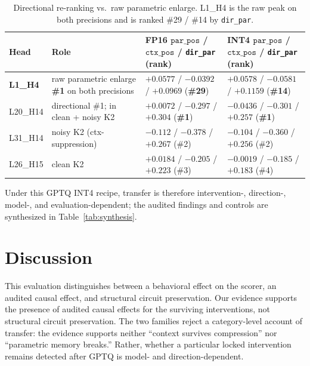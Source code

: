\documentclass{article} %
\begin{document}
\begin{table}[t]
\vspace{-6pt}
\caption{Directional re-ranking vs.\ raw parametric enlarge. L1\_H4 is the raw peak on both precisions and is ranked \#29 / \#14 by \texttt{dir\_par}.}
\label{tab:blindspot}
\centering
\scriptsize
\setlength{\tabcolsep}{2.5pt}
\begin{tabular}{p{0.55in}p{1.15in}p{1.7in}p{1.7in}}
\toprule
Head & Role & FP16 $\texttt{par\_pos}$ / $\texttt{ctx\_pos}$ / \texttt{dir\_par} (rank) & INT4 $\texttt{par\_pos}$ / $\texttt{ctx\_pos}$ / \texttt{dir\_par} (rank) \\
\midrule
\textbf{L1\_H4} & raw parametric enlarge \textbf{\#1} on both precisions & $\mathbf{+0.0577}$ / $-0.0392$ / $+0.0969$ (\textbf{\#29}) & $\mathbf{+0.0578}$ / $-0.0581$ / $+0.1159$ (\textbf{\#14}) \\
L20\_H14 & directional \#1; in clean + noisy K2 & $+0.0072$ / $-0.297$ / $\mathbf{+0.304}$ (\textbf{\#1}) & $\mathbf{-0.0436}$ / $-0.301$ / $+0.257$ (\textbf{\#1}) \\
L31\_H14 & noisy K2 (ctx-suppression) & $-0.112$ / $-0.378$ / $+0.267$ (\#2) & $-0.104$ / $-0.360$ / $+0.256$ (\#2) \\
L26\_H15 & clean K2 & $+0.0184$ / $-0.205$ / $+0.223$ (\#3) & $-0.0019$ / $-0.185$ / $+0.183$ (\#4) \\
\bottomrule
\end{tabular}
\vspace{-6pt}
\end{table}


Under this GPTQ INT4 recipe, transfer is therefore intervention-, direction-, model-, and evaluation-dependent; the audited findings and controls are synthesized in Table~\ref{tab:synthesis}.

\section{Discussion}
\label{sec:discussion}

This evaluation distinguishes between a behavioral effect on the scorer, an audited causal effect, and structural circuit preservation. Our evidence supports the presence of audited causal effects for the surviving interventions, not structural circuit preservation. The two families reject a category-level account of transfer: the evidence supports neither ``context survives compression'' nor ``parametric memory breaks.'' Rather, whether a particular locked intervention remains detected after GPTQ is model- and direction-dependent.
\end{document}
